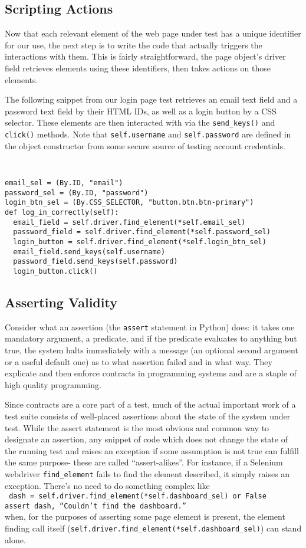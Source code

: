 \subsection{Scripting Actions}
Now that each relevant element of the web page under test has a unique identifier for our use, the next step is to write the code that actually triggers the interactions with them. This is fairly straightforward, the page object's driver field retrieves elements using these identifiers, then takes actions on those elements.

The following snippet from our login page test retrieves an email text field and a password text field by their HTML IDs, as well as a login button by a CSS selector. These elements are then interacted with via the \texttt{send\_keys()} and \texttt{click()} methods. Note that \texttt{self.username} and \texttt{self.password} are defined in the object constructor from some secure source of testing account credentials.

{\tt
\begin{verbatim}
email_sel = (By.ID, "email")
password_sel = (By.ID, "password")
login_btn_sel = (By.CSS_SELECTOR, "button.btn.btn-primary")
def log_in_correctly(self):
  email_field = self.driver.find_element(*self.email_sel)
  password_field = self.driver.find_element(*self.password_sel)
  login_button = self.driver.find_element(*self.login_btn_sel)
  email_field.send_keys(self.username)
  password_field.send_keys(self.password)
  login_button.click()
\end{verbatim}
}

\subsection{Asserting Validity}
Consider what an assertion (the \texttt{assert} statement in Python) does: it takes one mandatory argument, a predicate, and if the predicate evaluates to anything but true, the system halts immediately with a message (an optional second argument or a useful default one) as to what assertion failed and in what way. They explicate and then enforce contracts in programming systems and are a staple of high quality programming.

Since contracts are a core part of a test, much of the actual important work of a test suite consists of well-placed assertions about the state of the system under test. While the assert statement is the most obvious and common way to designate an assertion, any snippet of code which does not change the state of the running test and raises an exception if some assumption is not true can fulfill the same purpose- these are called ``assert-alikes''. For instance, if a Selenium webdriver \texttt{find\_element} fails to find the element described, it simply raises an exception. There's no need to do something complex like\\
\texttt{
 dash = self.driver.find\_element(*self.dashboard\_sel) or False\\
 assert dash, ``Couldn't find the dashboard.''\\
}
when, for the purposes of asserting some page element is present, the element finding call itself (\texttt{self.driver.find\_element(*self.dashboard\_sel)}) can stand alone.

